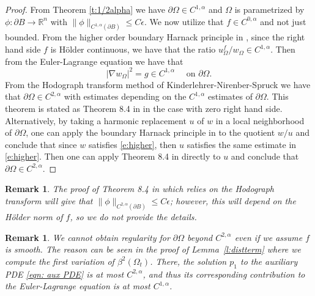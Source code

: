 \documentclass[10pt, reqno]{amsart}
\numberwithin{equation}{section}
\newtheorem{remark}[theorem]{Remark}
\def\R{{\mathbb R}}
\def\W{\Omega}
\begin{document}
\begin{proof}
  From Theorem \ref{t:1/2alpha} we have  $\partial \W \in C^{1,\alpha}$ and $\W$ is parametrized by $\phi: \partial B \to \mathbb{\R}^n$ with $\| \phi \|_{C^{1,\alpha}(\partial B)}\leq C\epsilon$. We now utilize that $f \in C^{0,\alpha}$ and not just bounded. From the higher order boundary Harnack principle in \cite{ds15}, since the right hand side $f$ is H\"older continuous, we have that the ratio $u_{\W}^f/w_{\W} \in C^{1,\alpha}$. Then from the Euler-Lagrange equation we have that 
\begin{equation} \label{e:higher}
|\nabla w_{\W}|^2 = g \in C^{1,\alpha} \quad \text{ on } \partial \W. 
\end{equation}
From the Hodograph transform method of Kinderlehrer-Nirenber-Spruck we have that $\partial \W \in C^{2,\alpha}$ with estimates depending on the $C^{1,\alpha}$ estimates of $\partial \W$. This theorem is stated as Theorem 8.4 in \cite{AC81} in the case with zero right hand side. Alternatively, by taking a harmonic replacement $u$ of $w$ in a local neighborhood of $\partial \W$, one can apply the boundary Harnack principle in \cite{ds15} to the quotient $w/u$ and conclude that since $w$ satisfies \eqref{e:higher}, then $u$ satisfies the same estimate in \eqref{e:higher}. Then one can apply Theorem 8.4 in \cite{AC81} directly to $u$ and conclude that $\partial \W \in C^{2,\alpha}$. 
\end{proof}

\begin{remark}
    \rm{The proof of Theorem 8.4 in \cite{AC81} which relies on the Hodograph transform will give that $\| \phi \|_{C^{2,\alpha}(\partial B)}\leq C\epsilon$; however, this will depend on the H\"older norm of $f$, so we do not provide the details. }
\end{remark}

\begin{remark}
    \rm{We cannot obtain regularity for $\partial \W$ beyond $C^{2,\alpha}$ even if we assume $f$ is smooth. The reason can be seen in the proof of Lemma~\ref{l:distterm} where we compute the first variation of $\beta^2(\Omega_t)$. There, the solution $p_1$ to the auxiliary PDE \eqref{eqn: aux PDE} is at most $C^{2,\alpha}$, and thus its corresponding contribution to the Euler-Lagrange equation is at most $C^{1,\alpha}$.}  
\end{remark}


\appendix
\end{document}
